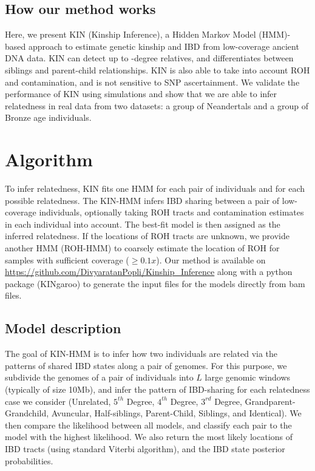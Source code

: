 \documentclass[12pt, letterpaper]{article}
\begin{document}
\subsection{How our method works}
Here, we present KIN (Kinship Inference), a Hidden Markov Model (HMM)-based approach to estimate genetic kinship and IBD from low-coverage ancient DNA data. KIN can detect up to -degree relatives, and differentiates between siblings and parent-child relationships. KIN is also able to take into account ROH and contamination, and is not sensitive to SNP ascertainment. We validate the performance of KIN using simulations and show that we are able to infer relatedness in real data from two datasets: a group of Neandertals and a group of Bronze age individuals.


\section{Algorithm}\label{new_approaches}
To infer relatedness, KIN fits one HMM for each pair of individuals and for each possible relatedness. The KIN-HMM infers IBD sharing between a pair of low-coverage individuals, optionally taking ROH tracts and contamination estimates in each individual into account. The best-fit model is then assigned as the inferred relatedness. If the locations of ROH tracts are unknown, we provide another HMM (ROH-HMM) to coarsely estimate the location of ROH for samples with sufficient coverage ($\geq 0.1x$). Our method is available on \url{https://github.com/DivyaratanPopli/Kinship_Inference} along with a python package (KINgaroo) to generate the input files for the models directly from bam files. 


\subsection{Model description}\label{method_overview} 
The goal of KIN-HMM is to infer how two individuals are related via the patterns of shared IBD states along a pair of genomes. For this purpose,  we subdivide the genomes of a pair of individuals into $L$ large genomic windows (typically of size 10Mb), and infer the pattern of IBD-sharing for each relatedness case we consider (Unrelated, $5^{th}$ Degree, $4^{th}$ Degree, $3^{rd}$ Degree, Grandparent-Grandchild, Avuncular, Half-siblings, Parent-Child, Siblings, and Identical). We then compare the likelihood between all models, and classify each pair to the model with the highest likelihood. We also return the most likely locations of IBD tracts (using standard Viterbi algorithm), and the IBD state posterior probabilities. 
\end{document}
